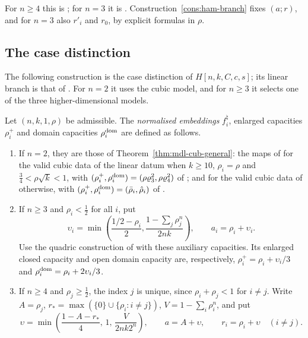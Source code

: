 For $n\ge4$ this is ; for $n=3$ it is .
Construction~\ref{cons:ham-branch} fixes $(a;r)$, and for $n=3$ also $r'_i$ and $r_0$, by explicit formulas in $\rho$.

\subsection{The case distinction}\label{p2:sec-models-branch}

The following construction is the case distinction of $H[n,k,C,c,s]$; its linear branch is that of
. For $n=2$ it uses the cubic model, and for $n\ge3$ it selects one of the three
higher-dimensional models.

\begin{construction}\label{cons:ham-branch}
Let $(n,k,1,\rho)$ be admissible. The \emph{normalised embeddings} $f^\natural_i$, enlarged capacities $\rho_i^+$ and domain capacities
$\rho_i^{\rm dom}$ are defined as follows.
\begin{enumerate}[label=(\roman*)]
\item If $n=2$, they are those of Theorem~\ref{thm:mdl-cub-general}: the maps of  for the valid
 cubic data of the linear datum when $k\ge10$, $\rho_i=\rho$ and $\frac34<\rho\sqrt k<1$, with
 $(\rho_i^+,\rho_i^{\rm dom})=(\rho \varrho_3^2,\rho \varrho_4^2)$ of ; and for the valid cubic data of
  otherwise, with $(\rho_i^+,\rho_i^{\rm dom})=(\bar\rho_i,\hat\rho_i)$ of
 .
\item If $n\ge3$ and $\rho_i<\frac12$ for all $i$, put
 \[
  \upsilon_i=\min\left(\frac{1/2-\rho_i}{2},
             \frac{1-\sum_j\rho_j^n}{2nk}\right),\qquad a_i=\rho_i+\upsilon_i.
 \]
 Use the quadric construction of  with these auxiliary capacities.
 Its enlarged closed capacity and open domain capacity are, respectively,
 $\rho_i^+=\rho_i+\upsilon_i/3$ and $\rho_i^{\rm dom}=\rho_i+2\upsilon_i/3$.
\item If $n\ge4$ and $\rho_j\ge\frac12$, the index $j$ is unique, since $\rho_i+\rho_j<1$ for $i\ne j$. Write $A=\rho_j$,
 $r_*=\max(\{0\}\cup\{\rho_i:i\ne j\})$, $V=1-\sum_i\rho_i^n$, and put
 \[
 \upsilon=\min\left(\frac{1-A-r_*}{4},\,1,\,\frac{V}{2nk2^n}\right),\qquad
 a=A+\upsilon,\qquad r_i=\rho_i+\upsilon \quad(i\ne j).
\]
\end{enumerate}
\end{construction}
